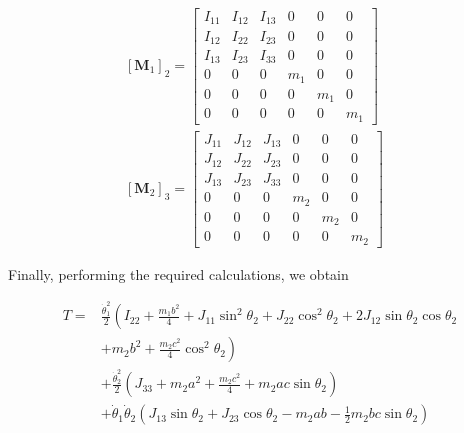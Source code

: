 \documentclass[conference]{IEEEtran}
\begin{document}
$$
    \begin{aligned}
        {\left[\mathbf{M}_1\right]_2 } = \left[\begin{array}{cccccc}
                                                       I_{11} & I_{12} & I_{13} & 0   & 0   & 0   \\
                                                       I_{12} & I_{22} & I_{23} & 0   & 0   & 0   \\
                                                       I_{13} & I_{23} & I_{33} & 0   & 0   & 0   \\
                                                       0      & 0      & 0      & m_1 & 0   & 0   \\
                                                       0      & 0      & 0      & 0   & m_1 & 0   \\
                                                       0      & 0      & 0      & 0   & 0   & m_1
                                                   \end{array}\right] & \\
        {\left[\mathbf{M}_2\right]_3 } = \left[\begin{array}{cccccc}
                                                       J_{11} & J_{12} & J_{13} & 0   & 0   & 0   \\
                                                       J_{12} & J_{22} & J_{23} & 0   & 0   & 0   \\
                                                       J_{13} & J_{23} & J_{33} & 0   & 0   & 0   \\
                                                       0      & 0      & 0      & m_2 & 0   & 0   \\
                                                       0      & 0      & 0      & 0   & m_2 & 0   \\
                                                       0      & 0      & 0      & 0   & 0   & m_2
                                                   \end{array}\right] &
    \end{aligned}
$$

Finally, performing the required calculations, we obtain
\begin{small}
    $$
        \begin{aligned}
            T= & \frac{\dot{\theta}_1^2 }{2}\left(I_{22}+\frac{m_1 b^2}{4}+J_{11} \sin ^2 \theta_2+J_{22} \cos ^2 \theta_2+2 J_{12} \sin \theta_2 \cos \theta_2 \right. \\
               & + \left. m_2 b^2+\frac{m_2 c^2}{4} \cos ^2 \theta_2\right)                                                                                             \\
               & +\frac{\dot{\theta}_2^2}{2}\left(J_{33}+m_2 a^2+\frac{m_2 c^2}{4}+m_2 a c \sin \theta_2\right)                                                         \\
               & +\dot{\theta}_1 \dot{\theta}_2 \left(J_{13} \sin \theta_2+J_{23} \cos \theta_2-m_2 a b-\frac{1}{2} m_2 b c \sin \theta_2\right)
        \end{aligned}
    $$
\end{small}
\end{document}
